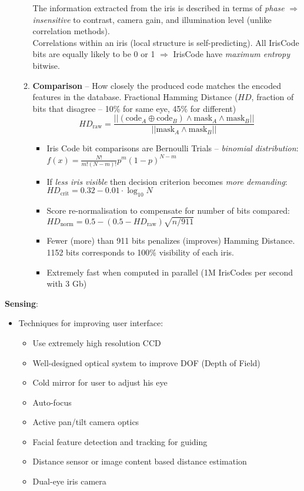 \documentclass[a4paper]{article}
\begin{document}
\begin{itemize}
\begin{enumerate}
          The information extracted from the iris is described in terms of \emph{phase} $\Rightarrow$ \emph{insensitive} to contrast, camera gain, and illumination level (unlike correlation methods).\\
          Correlations within an iris (local structure is self-predicting). All IrisCode bits are equally likely to be 0 or 1 $\Rightarrow$ IrisCode  have \emph{maximum entropy} bitwise.
          \item \textbf{Comparison} -- How closely the produced code matches the encoded features in the database. Fractional Hamming Distance ($HD$, fraction of bits that disagree -- 10\% for same eye, 45\% for different)
            $$HD_\text{raw}=\frac{||(\text{code}_A \oplus\text{code}_B)\land \text{mask}_A\land \text{mask}_B||}{||\text{mask}_A\land \text{mask}_B||}$$
          \begin{itemize}
            \item Iris Code bit comparisons are Bernoulli Trials -- \emph{binomial distribution}:\\$f(x)=\frac{N!}{m!(N-m)!}p^m(1-p)^{N-m}$\\
            \item If \emph{less iris visible} then decision criterion becomes \emph{more demanding}:\\ $HD_\text{crit}=0.32-0.01\cdot\log_{10}{N}$
            \item Score re-normalisation to compensate for number of bits compared:\\$HD_\text{norm}=0.5-(0.5-HD_\text{raw})\sqrt{n/911}$
            \item Fewer (more) than 911 bits penalizes (improves) Hamming Distance. 1152 bits corresponds to 100\% visibility of each iris.
            \item Extremely fast when computed in parallel (1M IrisCodes per second with 3 Gb)
          \end{itemize}
        \end{enumerate}
      \end{itemize}

      \textbf{Sensing}:
      \begin{itemize}
        \item Techniques for improving user interface:
        \begin{itemize}
          \item Use extremely high resolution CCD 
          \item Well-designed optical system to improve DOF (Depth of Field)
          \item Cold mirror for user to adjust his eye
          \item Auto-focus
          \item Active pan/tilt camera optics
          \item Facial feature detection and tracking for guiding
          \item Distance sensor or image content based distance estimation
          \item Dual-eye iris camera
        \end{itemize}
      \end{itemize}
\end{document}

